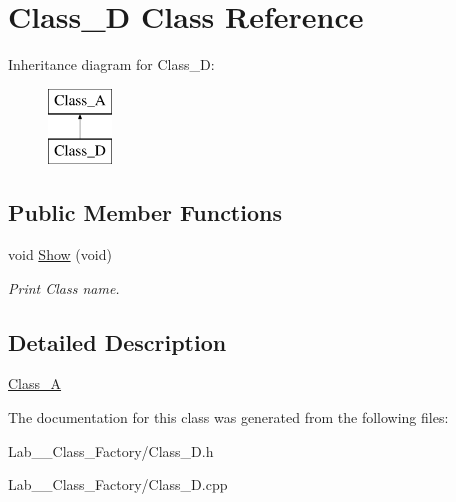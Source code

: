\hypertarget{class_class___d}{\section{Class\+\_\+\+D Class Reference}
\label{class_class___d}
}
Inheritance diagram for Class\+\_\+\+D\+:\begin{figure}[H]
\begin{center}
\leavevmode
\includegraphics[height=2.000000cm]{class_class___d}
\end{center}
\end{figure}
\subsection*{Public Member Functions}
\begin{DoxyCompactItemize}
\item 
\hypertarget{class_class___d_ab98bb7922851ab7133863e6fb16aa17c}{void \hyperlink{class_class___d_ab98bb7922851ab7133863e6fb16aa17c}{Show} (void)}\label{class_class___d_ab98bb7922851ab7133863e6fb16aa17c}

\begin{DoxyCompactList}\small\item\em Print Class name. \end{DoxyCompactList}\end{DoxyCompactItemize}


\subsection{Detailed Description}
\hyperlink{class_class___a}{Class\+\_\+\+A} 

The documentation for this class was generated from the following files\+:\begin{DoxyCompactItemize}
\item 
Lab\+\_\+\_\+\+Class\+\_\+\+Factory/Class\+\_\+\+D.\+h\item 
Lab\+\_\+\_\+\+Class\+\_\+\+Factory/Class\+\_\+\+D.\+cpp\end{DoxyCompactItemize}

